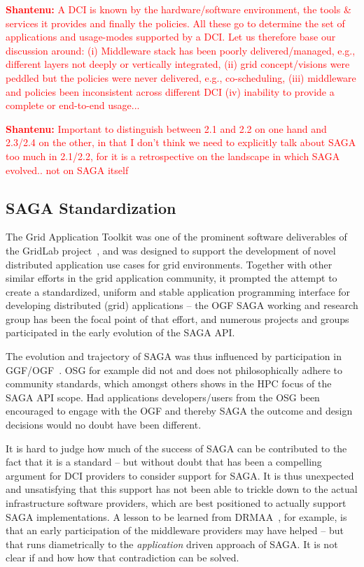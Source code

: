 \documentclass{article}
\newcommand{\I}[1]{\textit{#1}}
\newcommand{\B}[1]{\textbf{#1}}
\newcommand{\jhanote}[1]{{\textcolor{red}{     \B{Shantenu:} #1 }}}
\newcommand{\jhanote}[1]{}
\begin{document}
  \jhanote{A DCI is known by the hardware/software environment, the
  tools \& services it provides and finally the policies. All these go
  to determine the set of applications and usage-modes supported by
  a DCI. Let us therefore base our discussion around: (i) Middleware
  stack has been poorly delivered/managed, e.g., different layers not
  deeply or vertically integrated, (ii) grid concept/visions were
  peddled but the policies were never delivered, e.g., co-scheduling,
  (iii) middleware and policies been inconsistent across different DCI
  (iv) inability to provide a complete or end-to-end usage...}
  
  \jhanote{Important to distinguish between 2.1 and 2.2 on one hand and
  2.3/2.4 on the other, in that I don't think we need to explicitly talk
  about SAGA too much in 2.1/2.2, for it is a retrospective on the
  landscape in which SAGA evolved.. not on SAGA itself}


 \subsection{SAGA Standardization}

  The Grid Application Toolkit was one of the prominent software
  deliverables of the GridLab project~\cite{gridlab}, and was designed
  to support the development of novel distributed application use cases
  for grid environments.  Together with other similar efforts in the
  grid application community, it prompted the attempt to create
  a standardized, uniform and stable application programming interface
  for developing distributed (grid) applications -- the OGF SAGA working
  and research group has been the focal point of that effort, and
  numerous projects and groups participated in the early evolution of
  the SAGA API.  

  The evolution and trajectory of SAGA was thus influenced by
  participation in GGF/OGF~\cite{ogf_web}.  OSG for example did not and
  does not philosophically adhere to community standards, which amongst
  others shows in the HPC focus of the SAGA API scope. Had applications
  developers/users from the OSG been encouraged to engage with the OGF
  and thereby SAGA the outcome and design decisions would no doubt have
  been different.

  It is hard to judge how much of the success of SAGA can be contributed
  to the fact that it is a standard -- but without doubt that has been
  a compelling argument for DCI providers to consider support for SAGA.
  It is thus unexpected and unsatisfying that this support has not been
  able to trickle down to the actual infrastructure software providers,
  which are best positioned to actually support SAGA implementations.
  A lesson to be learned from DRMAA~\cite{drmaa}, for example, is that
  an early participation of the middleware providers may have helped --
  but that runs diametrically to the \I{application} driven approach of
  SAGA.  It is not clear if and how how that contradiction can be
  solved.
\end{document}
